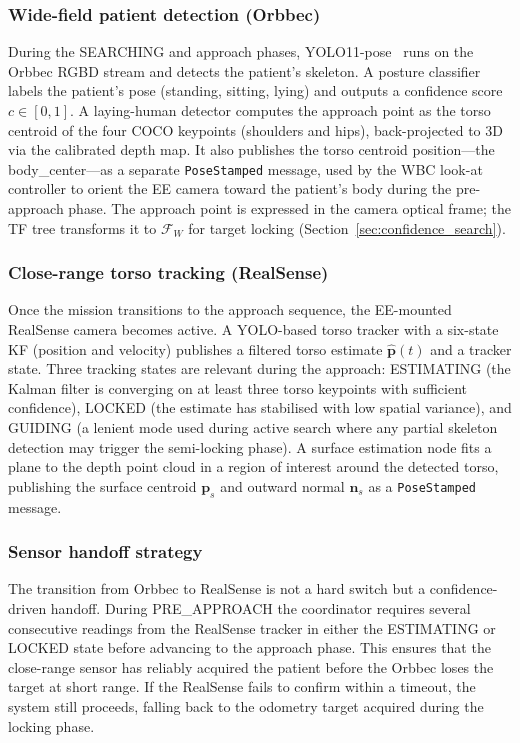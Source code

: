 \subsubsection{Wide-field patient detection (Orbbec)}

During the SEARCHING and approach phases, \ac{YOLO}11-pose~\cite{maji2022}
runs on the Orbbec \ac{RGBD} stream and detects the patient's skeleton. A
posture classifier labels the patient's pose (standing, sitting, lying) and
outputs a confidence score $c \in [0, 1]$. A laying-human detector
computes the approach point as the torso centroid of the four \ac{COCO}
keypoints (shoulders and hips), back-projected to 3D via the calibrated
depth map. It also publishes the torso centroid position---the
body\_center---as a separate \texttt{PoseStamped} message, used by the
\ac{WBC} look-at controller to orient the \ac{EE} camera toward the
patient's body during the pre-approach phase. The approach point is
expressed in the camera optical frame; the \ac{TF} tree transforms it to
$\mathcal{F}_W$ for target locking
(Section~\ref{sec:confidence_search}).

\subsubsection{Close-range torso tracking (RealSense)}

Once the mission transitions to the approach sequence, the \ac{EE}-mounted
RealSense camera becomes active. A \ac{YOLO}-based torso tracker with a
six-state \ac{KF} (position and velocity) publishes a filtered torso
estimate $\hat{\mathbf{p}}(t)$ and a tracker state. Three tracking states
are relevant during the approach: ESTIMATING (the Kalman filter is
converging on at least three torso keypoints with sufficient confidence),
LOCKED (the estimate has stabilised with low spatial variance), and GUIDING
(a lenient mode used during active search where any partial skeleton
detection may trigger the semi-locking phase). A surface estimation node
fits a plane to the depth point cloud in a region of interest around the
detected torso, publishing the surface centroid $\mathbf{p}_s$ and outward
normal $\mathbf{n}_s$ as a \texttt{PoseStamped} message.

\subsubsection{Sensor handoff strategy}

The transition from Orbbec to RealSense is not a hard switch but a
confidence-driven handoff. During PRE\_APPROACH the coordinator requires
several consecutive readings from the RealSense tracker in either the
ESTIMATING or LOCKED state before advancing to the approach phase. This
ensures that the close-range sensor has reliably acquired the patient
before the Orbbec loses the target at short range. If the RealSense fails
to confirm within a timeout, the system still proceeds, falling back to
the odometry target acquired during the locking phase.


